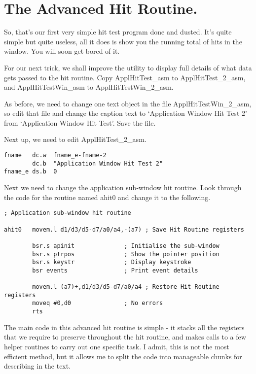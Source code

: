 \section{The Advanced Hit Routine.}
\label{ch28-appl-adv-hit}%

So, that's our first very simple hit test program done and dusted. It's
        quite simple but quite useless, all it does is show you the running total of hits
        in the window. You will soon get bored of it.

For our next trick, we shall improve the utility to display full details of
        what data gets passed to the hit routine. Copy
 ApplHitTest\_asm to ApplHitTest\_2\_asm,
        and ApplHitTestWin\_asm to
 ApplHitTestWin\_2\_asm.

As before, we need to change one text object in the file
 ApplHitTestWin\_2\_asm, so edit that file and change the
        caption text to `Application Window Hit Test 2' from `Application Window Hit Test'.
        Save the file.

Next up, we need to edit ApplHitTest\_2\_asm.

\begin{lstlisting}[firstnumber=1,]
fname   dc.w  fname_e-fname-2
        dc.b  "Application Window Hit Test 2"
fname_e ds.b  0
\end{lstlisting}

Next we need to change the application sub-{}window hit routine. Look through
        the code for the routine named ahit0 and change it to the following.

\begin{lstlisting}[firstnumber=1,]
; Application sub-window hit routine

ahit0   movem.l d1/d3/d5-d7/a0/a4,-(a7) ; Save Hit Routine registers

        bsr.s apinit              ; Initialise the sub-window
        bsr.s ptrpos              ; Show the pointer position
        bsr.s keystr              ; Display keystroke
        bsr events                ; Print event details

        movem.l (a7)+,d1/d3/d5-d7/a0/a4 ; Restore Hit Routine registers
        moveq #0,d0               ; No errors
        rts
\end{lstlisting}

The main code in this advanced hit routine is simple -{} it stacks all the
        registers that we require to preserve throughout the hit routine, and makes calls
        to a few helper routines to carry out one specific task. I admit, this is not the
        most efficient method, but it allows me to split the code into manageable chunks
        for describing in the text.

